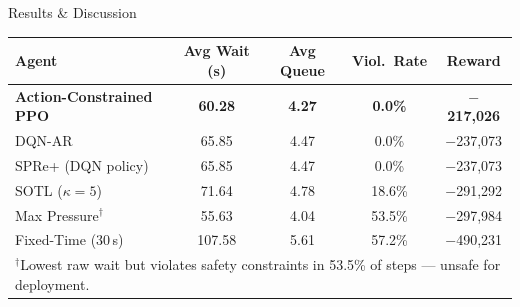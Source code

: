 \documentclass[final,20pt]{beamer}
\newlength{\colwidth}
\begin{document}
\begin{frame}[t]
\begin{columns}[t]
\begin{column}{\colwidth}
\begin{block}{Results \& Discussion}
    \begin{center}
    \begin{tabular}{lcccc}
      \toprule
      \textbf{Agent} & \textbf{Avg Wait (s)} & \textbf{Avg Queue}
                     & \textbf{Viol.\ Rate}  & \textbf{Reward} \\
      \midrule
      \textbf{Action-Constrained PPO} & \textbf{60.28} & \textbf{4.27}
                                      & \textbf{0.0\%} & \textbf{$-$217,026} \\
      DQN-AR                          & 65.85           & 4.47
                                      & 0.0\%           & $-$237,073 \\
      SPRe+ (DQN policy)              & 65.85           & 4.47
                                      & 0.0\%           & $-$237,073 \\
      SOTL ($\kappa\!=\!5$)           & 71.64           & 4.78
                                      & 18.6\%          & $-$291,292 \\
      Max Pressure$^\dagger$          & 55.63           & 4.04
                                      & 53.5\%          & $-$297,984 \\
      Fixed-Time (30\,s)              & 107.58          & 5.61
                                      & 57.2\%          & $-$490,231 \\
      \bottomrule
      \multicolumn{5}{l}{\small $^\dagger$Lowest raw wait but violates safety
        constraints in 53.5\% of steps --- unsafe for deployment.}
    \end{tabular}
    \end{center}

    \vspace{0.8cm}


\end{block}
\end{column}
\end{columns}
\end{frame}
\end{document}

